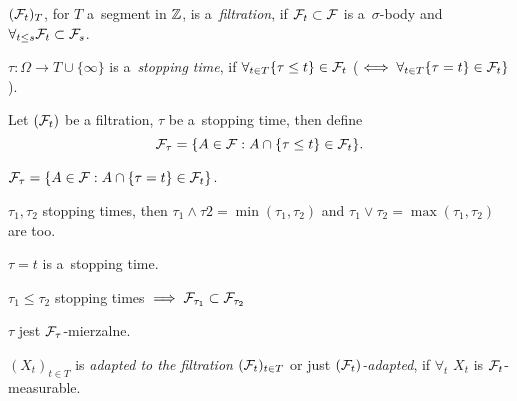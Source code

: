 



	\begin{definition}[filtration]
		$(\mathcal{F}_t)_T$, for $T$ a~segment in ${\mathbb{Z}}$, is a~\emph{filtration},
		if $\mathcal{F}_t \subset \mathcal{F}$ is a~$\sigma$-body and $\forall_{t \leq s} \mathcal{F}_t \subset \mathcal{F}_s$.
	\end{definition}
	
	\begin{definition}
		$\tau: \Omega \to T \cup \{\infty\}$ is a~\emph{stopping time}, if
		$\forall_{t \in T} \{\tau \leq t\} \in \mathcal{F}_t$
		($\iff \forall_{t \in T} \{ \tau = t\} \in \mathcal{F}_t\}$).
	\end{definition}
	
	\begin{definition}
		Let $(\mathcal{F}_t)$ be a filtration, $\tau$ be a~stopping time, then define
		$$\mathcal{F}_\tau = \{ A \in \mathcal{F}: A \cap \{ \tau \leq t\} \in \mathcal{F}_t\}.$$
	\end{definition}
	
	\begin{proposition}
		$\mathcal{F}_\tau = \{ A \in \mathcal{F}: A \cap \{ \tau = t \} \in \mathcal{F}_t\}$.
	\end{proposition}
	
	\begin{proposition}
		$\tau_1, \tau_2$ stopping times, then $\tau_1 \wedge \tau2 = \min(\tau_1, \tau_2)$
		and $\tau_1 \vee \tau_2 = \max(\tau_1, \tau_2)$ are too.
		
		$\tau = t$ is a~stopping time.
		
		$\tau_1 \leq \tau_2$ stopping times $\implies \mathcal{F}_{\tau_1} \subset \mathcal{F}_{\tau_2}$
		
		$\tau$ jest $\mathcal{F}_\tau$-mierzalne.
	\end{proposition}
	
	\begin{definition}
		$(X_t)_{t \in T}$ is \emph{adapted to the filtration} $(\mathcal{F}_t)_{t \in T}$ or just \emph{$(\mathcal{F}_t)$-adapted}, if $\forall_t$ $X_t$ is $\mathcal{F}_t$-measurable.
	\end{definition}
	
